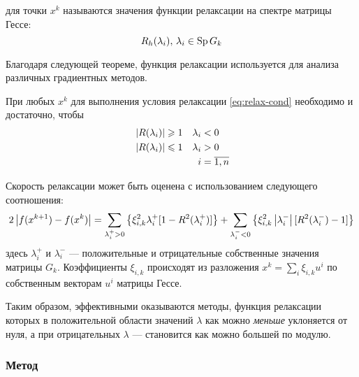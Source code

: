 \begin{dfn}
   для точки $x^k$ называются значения
  функции релаксации на спектре матрицы Гессе:
  \begin{equation}
    \label{eq:relax-fac}
    R_h(\lambda_i),\, \lambda_i \in \operatorname{Sp}{G_k}
  \end{equation}
\end{dfn}

Благодаря следующей теореме, функция релаксации используется для
анализа различных градиентных методов.

\begin{thm}
  \label{thm:relax-thm}
  При любых $x^k$ для выполнения условия релаксации
  \eqref{eq:relax-cond} необходимо и достаточно, чтобы
  \begin{equation}
    \label{eq:relax-thm}
    \begin{aligned}
      & \left \lvert{R(\lambda_i)}\right \rvert \geqslant 1 & \lambda_i& < 0 \\
      & \left \lvert{R(\lambda_i)}\right \rvert \leqslant 1 & \lambda_i& > 0\\
      &&i& = \overline{1, n}
    \end{aligned}
  \end{equation}
\end{thm}



Скорость релаксации может быть оценена с использованием следующего
соотношения:
\begin{equation}
  \label{eq:relax-speed}
  2\left \lvert{f(x^{k+1})-f(x^k)}\right \rvert=\sum_{\lambda_i^+>0} \left\{\xi_{i,k}^2
    \lambda_i^+ [1-R^2(\lambda_i^+)]\right\} + \sum_{\lambda_i^-<0} \left\{\xi_{i,k}^2
    \left \lvert{\lambda_i^-}\right \rvert [R^2(\lambda_i^-)-1]\right\}
\end{equation}
здесь $\lambda_i^+$ и $\lambda_i^-$ — положительные и отрицательные
собственные значения матрицы $G_k$. Коэффициенты $\xi_{i,k}$
происходят из разложения $x^k=\sum_i{\xi_{i,k}u^i}$ по собственным
векторам $u^i$ матрицы Гессе.

Таким образом, эффективными оказываются методы, функция релаксации
которых в положительной области значений $\lambda$ как можно
\emph{меньше} уклоняется от нуля, а при отрицательных $\lambda$ —
становится как можно большей по модулю.

\subsubsection{Метод \gd{}}
\label{sec:gd}

